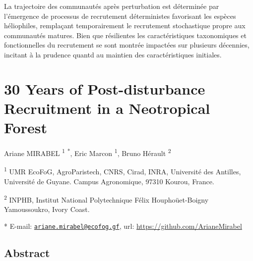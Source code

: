 \documentclass[
  11pt,
  french,
  A4paper,
  extrafontsizes,onecolumn,openright
  ]{memoir}
\begin{document}
La trajectoire des communautés après perturbation est déterminée par
l'émergence de processus de recrutement déterministes favorisant les
espèces héliophiles, remplaçant temporairement le recrutement
stochastique propre aux communautés matures. Bien que résilientes les
caractéristiques taxonomiques et fonctionnelles du recrutement se sont
montrée impactées sur plusieurs décennies, incitant à la prudence quantd
au maintien des caractéristiques initiales.

\newpage

\section{30 Years of Post-disturbance Recruitment in a Neotropical
Forest}\label{years-of-post-disturbance-recruitment-in-a-neotropical-forest}

Ariane MIRABEL \textsuperscript{1} \textsuperscript{*}, Eric Marcon
\textsuperscript{1}, Bruno Hérault \textsuperscript{2} \newline

\textsuperscript{1} UMR EcoFoG, AgroParistech, CNRS, Cirad, INRA,
Université des Antilles, Université de Guyane. Campus Agronomique, 97310
Kourou, France.

\textsuperscript{2} INPHB, Institut National Polytechnique Félix
Houphoüet-Boigny Yamoussoukro, Ivory Coast. \newline

* E-mail:
\href{mailto:ariane.mirabel@ecofog.gf}{\nolinkurl{ariane.mirabel@ecofog.gf}},
url: \url{https://github.com/ArianeMirabel}

\subsection{Abstract}\label{abstract-2}
\end{document}
